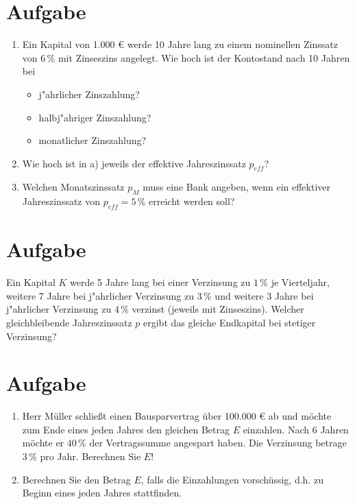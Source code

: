 \documentclass[fontsize=11pt, parskip=half]{scrartcl}
\begin{document}
    \section{Aufgabe}
    \begin{enumerate}
    \item Ein Kapital von 1.000 € werde 10 Jahre lang zu einem
    nominellen Zinssatz von $6 \,\%$ mit Zinseszins angelegt.
     Wie hoch ist der Kontostand nach 10 Jahren bei \vspace{-0.2cm}
    \begin{itemize}
    \item j"ahrlicher Zinszahlung? \item halbj"ahriger Zinszahlung?
    \item monatlicher Zinszahlung?
    \end{itemize}\vspace{-0.2cm}
    \item Wie hoch ist in a) jeweils der effektive Jahreszinssatz
    $p_{eff}$? \item Welchen Monatszinssatz $p_M$ muss eine Bank
    angeben, wenn ein effektiver Jahreszinssatz von $p_{eff}=5$\,\%
    erreicht werden soll?
    \end{enumerate}
    

    
    \section{Aufgabe}
     Ein Kapital $K$ werde 5 Jahre lang bei einer Verzinsung zu $1
    \,\%$ je Vierteljahr, weitere 7 Jahre bei j"ahrlicher Verzinsung zu
    $3 \,\%$ und weitere 3 Jahre bei j"ahrlicher Verzinsung zu $4 \,\%$
    verzinst (jeweils mit Zinseszins). Welcher gleichbleibende
    Jahreszinssatz $p$ ergibt das gleiche Endkapital bei stetiger
    Verzinsung?
    
  
    
    \section{Aufgabe} 
    \begin{enumerate} 
        \item Herr Müller
    schlie{\ss}t einen Bausparvertrag über 100.000 € ab und möchte
    zum Ende eines jeden Jahres den gleichen Betrag $E$ einzahlen. Nach
    6 Jahren möchte er $40\,\%$ der Vertragssumme angespart haben. Die
    Verzinsung betrage $3\,\%$ pro Jahr. Berechnen Sie $E$! \item
    Berechnen Sie den Betrag $E$, falls die Einzahlungen vorschüssig,
    d.h. zu Beginn eines jeden Jahres stattfinden.
    \end{enumerate}
    
\end{document}
